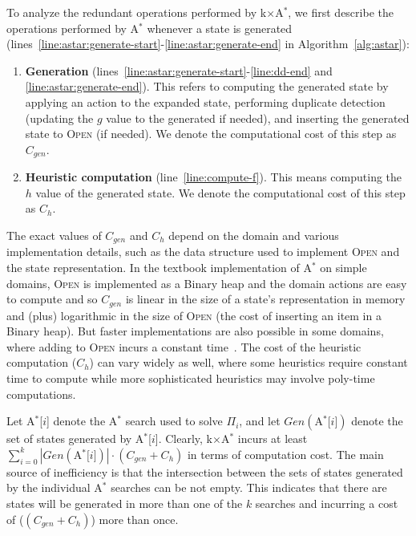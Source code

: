 \documentclass{aicom2e}
\newcommand{\astar}{A$^*$}
\newcommand{\kxastar}{k$\times$A$^*$}
\newcommand{\astari}[1]{A$^*$[$#1$]}
\newcommand{\open}{\textsc{Open}}
\begin{document}
To analyze the redundant operations performed by \kxastar{}, we first describe
the operations performed by \astar{} whenever a state is generated
(lines~\ref{line:astar:generate-start}-\ref{line:astar:generate-end} in
Algorithm~\ref{alg:astar}):

\begin{enumerate}
	\item {\bf Generation}  (lines~\ref{line:astar:generate-start}-\ref{line:dd-end} and \ref{line:astar:generate-end}). 
	This refers to computing the generated state by applying an action to the expanded state, 
	performing duplicate detection (updating the $g$ value to the generated if needed), 
	and inserting the generated state to \open{} (if needed). 
	We denote the computational cost of this step as $C_{gen}$.
	
		
	\item {\bf Heuristic computation}  (line~\ref{line:compute-f}). This means computing the $h$ value of the generated state. 
	We denote the computational cost of this step as $C_{h}$.
\end{enumerate}	
The exact values of $C_{gen}$ and $C_h$ depend on the domain and various implementation details, 
such as the data structure used to implement \open{} and the state representation. 
In the textbook implementation of \astar{} on simple domains, 
\open{} is implemented as a Binary heap and the domain actions are easy to compute 
and so $C_{gen}$ is linear in the size  of a state's representation in memory and (plus) logarithmic in the size of \open{} 
(the cost of inserting an item in a Binary heap). 
But faster implementations are also possible in some domains, where adding to \open{} incurs a constant time~\cite{GILON2016,BurnsHLR12}.
The cost of the heuristic computation ($C_h$) can vary widely as well, 
where some heuristics require constant time to compute while more sophisticated heuristics may involve poly-time computations. 




Let \astari{i} denote the \astar{} search used to solve $\Pi_i$, and let
$Gen(\text{\astari{i}})$ denote the set of states generated by \astari{i}.
Clearly, \kxastar{} incurs at least $\sum_{i=0}^k
|Gen(\text{\astari{i}})|\cdot(C_{gen}+C_{h})$ in terms of
computation cost. The main source of inefficiency is that the intersection
between the sets of states generated by the individual \astar{} searches can be
not empty. This indicates that there are states will be generated in more than
one of the $k$ searches and incurring a cost of 
($(C_{gen}+C_{h})$) more than once.
\end{document}
